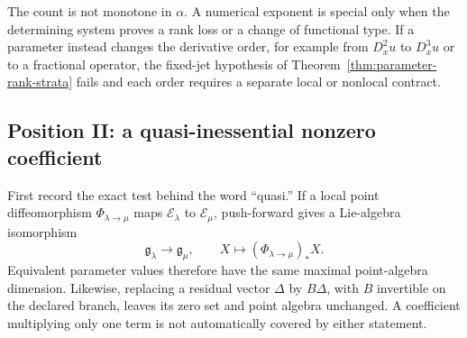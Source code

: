 \documentclass[11pt]{article}
\theoremstyle{definition}
\begin{document}
The count is not monotone in $\alpha$. A numerical exponent is special only
when the determining system proves a rank loss or a change of functional
type. If a parameter instead changes the derivative order, for example from
$D_x^2u$ to $D_x^3u$ or to a fractional operator, the fixed-jet hypothesis of
Theorem~\ref{thm:parameter-rank-strata} fails and each order requires a
separate local or nonlocal contract.

\subsection{Position II: a quasi-inessential nonzero coefficient}
First record the exact test behind the word ``quasi.'' If a local point
diffeomorphism $\Phi_{\lambda\to\mu}$ maps $\mathcal E_\lambda$ to
$\mathcal E_\mu$, push-forward gives a Lie-algebra isomorphism
\begin{equation}
 \mathfrak g_\lambda\longrightarrow\mathfrak g_\mu,
 \qquad X\longmapsto(\Phi_{\lambda\to\mu})_*X.
 \label{eq:equivalence-isomorphism}
\end{equation}
Equivalent parameter values therefore have the same maximal point-algebra
dimension. Likewise, replacing a residual vector $\Delta$ by $B\Delta$, with
$B$ invertible on the declared branch, leaves its zero set and point algebra
unchanged. A coefficient multiplying only one term is not automatically
covered by either statement.
\end{document}

